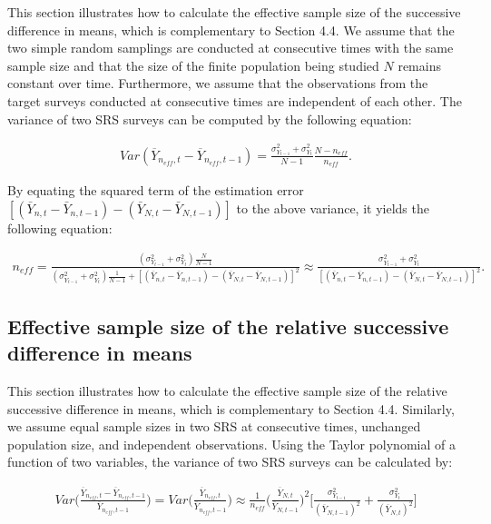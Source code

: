 \documentclass{article}
\begin{document}
This section illustrates how to calculate the effective sample size of the successive difference in means, which is complementary to Section 4.4. We assume that the two simple random samplings are conducted at consecutive times with the same sample size and that the size of the finite population being studied $N$ remains constant over time. Furthermore, we assume that the observations from the target surveys conducted at consecutive times are independent of each other. The variance of two SRS surveys can be computed by the following equation:

\begin{align*}
    Var(\overline{Y}_{n_{eff}, t} - \overline{Y}_{n_{eff}, {t-1}}) = \frac{\sigma^2_{Y_{t-1}} + \sigma^2_{Y_{t}}}{N -1} \frac{N - n_{eff}}{n_{eff}}.
\end{align*}

\noindent By equating the squared term of the estimation error $[(\bar{Y}_{n,t} - \bar{Y}_{n,t-1}) - (\bar{Y}_{N,t} - \bar{Y}_{N,t-1})]$ to the above variance, it yields the following equation:

\begin{align*}
    n_{eff} = \frac{(\sigma^2_{Y_{t-1}} + \sigma^2_{Y_{t}}) \frac{N}{{N-1}}}{(\sigma^2_{Y_{t-1}} + \sigma^2_{Y_{t}}) \frac{1}{{N-1}} + [(\overline{Y}_{n,t} - \overline{Y}_{n,t-1})-(\overline{Y}_{N,t} - \overline{Y}_{N,t-1})]^2} \approx \frac{\sigma_{Y_{t-1}}^2 + \sigma_{Y_t}^2}{[(\overline{Y}_{n,t} - \overline{Y}_{n,t-1})-(\overline{Y}_{N,t} - \overline{Y}_{N,t-1})]^2}.
\end{align*}

\subsection{Effective sample size of the relative successive difference in means}

This section illustrates how to calculate the effective sample size of the relative successive difference in means, which is complementary to Section 4.4. Similarly, we assume equal sample sizes in two SRS at consecutive times, unchanged population size, and independent observations. Using the Taylor polynomial of a function of two variables, the variance of two SRS surveys can be calculated by: 

\begin{align*}
    Var\Big(\frac{\overline{Y}_{n_{eff}, t} - \overline{Y}_{n_{eff}, {t-1}}}{\overline{Y}_{n_{eff}, {t-1}}}\Big) = Var\Big(\frac{\overline{Y}_{n_{eff}, t}}{\overline{Y}_{n_{eff}, {t-1}}}\Big) \approx \frac{1}{n_{eff}} {\Big(\frac{\overline{Y}_{N,t}}{\overline{Y}_{N,t-1}}\Big)^2\big[\frac{\sigma_{Y_{t-1}}^2}{(\overline{Y}_{N,t-1})^2} + \frac{\sigma_{Y_t}^2}{(\overline{Y}_{N,t})^2}\big]}
\end{align*}
\end{document}
